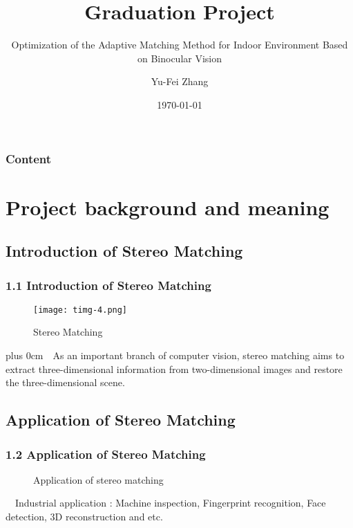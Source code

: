 \documentclass{beamer}
\begin{document}
\title{Graduation Project}
\subtitle{Optimization of the Adaptive Matching Method for Indoor Environment Based on Binocular Vision}
\author{Yu-Fei Zhang}
\date{\today}

\renewcommand{\raggedright}{\leftskip=0pt \rightskip=0pt plus 0cm}


\begin{frame}
\titlepage
\end{frame}


\begin{frame}
\frametitle{Content}
\tableofcontents
\end{frame}

\section{Project background and meaning}
\subsection{Introduction of Stereo Matching}
\begin{frame}
\frametitle{1.1 Introduction of Stereo Matching}


\begin{figure}
\centering
\texttt{[image: timg-4.png]}
\caption{Stereo Matching}
\end{figure}


\raggedright ~~As an important branch of computer vision, stereo matching aims to extract three-dimensional information from two-dimensional images and restore the three-dimensional scene.



\end{frame}

\subsection{Application of Stereo Matching}
\begin{frame}
\frametitle{1.2 Application of Stereo Matching}

\begin{figure}
\centering
{}
\caption{Application of stereo matching}
\end{figure}

~~Industrial application : Machine inspection, Fingerprint recognition, Face detection, 3D reconstruction and etc.
\end{frame}
\end{document}
